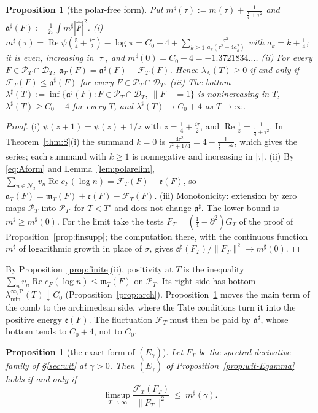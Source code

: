 \documentclass[11pt]{amsart}
\newtheorem{proposition}[theorem]{Proposition}
\theoremstyle{definition}
\theoremstyle{remark}
\newcommand{\Rel}{\operatorname{Re}}
\newcommand{\PT}{\mathcal P_T}
\newcommand{\lamA}{\lambda_{\mathrm A}(T)}
\newcommand{\Fh}{\widehat F}
\newcommand{\cF}{c_F}
\newcommand{\NT}{\mathcal N_T}
\newcommand{\mT}{\mathfrak m_T}
\newcommand{\laminfP}{\lambda^{\infty,\mathrm P}_{\min}}
\begin{document}
\begin{proposition}[the polar-free form]\label{prop:sharp}
Put $m^\sharp(\tau):=m(\tau)+\frac1{\frac14+\tau^2}$ and $\mathfrak a^\sharp(F):=\frac1{2\pi}\int m^\sharp|\Fh|^2$.
\emph{(i)} $m^\sharp(\tau)=\Rel\psi(\frac54+\frac{i\tau}2)-\log\pi=C_0+4+\sum_{k\ge1}\frac{\tau^2}{a_k(\tau^2+4a_k^2)}$ with
$a_k=k+\frac14$; it is even, increasing in $|\tau|$, and $m^\sharp(0)=C_0+4=-1.3721834\ldots$.
\emph{(ii)} For every $F\in\PT\cap\mathcal D_T$, $\mathfrak a_T(F)=\mathfrak a^\sharp(F)-\mathcal F_T(F)$. Hence $\lamA\ge0$
if and only if $\mathcal F_T(F)\le\mathfrak a^\sharp(F)$ for every $F\in\PT\cap\mathcal D_T$.
\emph{(iii)} The bottom $\lambda^\sharp(T):=\inf\{\mathfrak a^\sharp(F):F\in\PT\cap\mathcal D_T,\ \|F\|=1\}$ is nonincreasing in $T$,
$\lambda^\sharp(T)\ge C_0+4$ for every $T$, and $\lambda^\sharp(T)\to C_0+4$ as $T\to\infty$.
\end{proposition}

\begin{proof}
(i) $\psi(z+1)=\psi(z)+1/z$ with $z=\frac14+\frac{i\tau}2$, and $\Rel\frac1z=\frac1{\frac14+\tau^2}$. In Theorem~\ref{thm:S}(i) the
summand $k=0$ is $\frac{4\tau^2}{\tau^2+1/4}=4-\frac1{\frac14+\tau^2}$, which gives the series; each summand with $k\ge1$ is
nonnegative and increasing in $|\tau|$. (ii) By \eqref{eq:Aform} and Lemma~\ref{lem:polarelim},
$\sum_{n\in\NT}v_n\Rel\cF(\log n)=\mathcal F_T(F)-\mathfrak e(F)$, so
$\mathfrak a_T(F)=\mT(F)+\mathfrak e(F)-\mathcal F_T(F)$. (iii) Monotonicity: extension by zero maps $\PT$ into
$\mathcal P_{T'}$ for $T<T'$ and does not change $\mathfrak a^\sharp$. The lower bound is $m^\sharp\ge m^\sharp(0)$. For the
limit take the tests $F_T=(\frac14-\partial^2)G_T$ of the proof of Proposition~\ref{prop:finsupp}; the computation there,
with the continuous function $m^\sharp$ of logarithmic growth in place of $\sigma$, gives
$\mathfrak a^\sharp(F_T)/\|F_T\|^2\to m^\sharp(0)$.
\end{proof}

By Proposition~\ref{prop:finite}(ii), positivity at $T$ is the inequality
$\sum_nv_n\Rel\cF(\log n)\le\mT(F)$ on $\PT$. Its right side has bottom $\laminfP(T)\downarrow C_0$
(Proposition~\ref{prop:arch}). Proposition~\ref{prop:sharp} moves the main term of the comb to the archimedean side, where the
Tate conditions turn it into the positive energy $\mathfrak e(F)$. The fluctuation $\mathcal F_T$ must then be paid by
$\mathfrak a^\sharp$, whose bottom tends to $C_0+4$, not to $C_0$.

\begin{proposition}[the exact form of $(E_\gamma)$]\label{prop:Egamma-exact}
Let $F_T$ be the spectral-derivative family of \S\ref{sec:wit} at $\gamma>0$. Then $(E_\gamma)$ of
Proposition~\ref{prop:wit-Egamma} holds if and only if
\[
\limsup_{T\to\infty}\frac{\mathcal F_T(F_T)}{\|F_T\|^2}\ \le\ m^\sharp(\gamma).
\]
\end{proposition}
\end{document}
